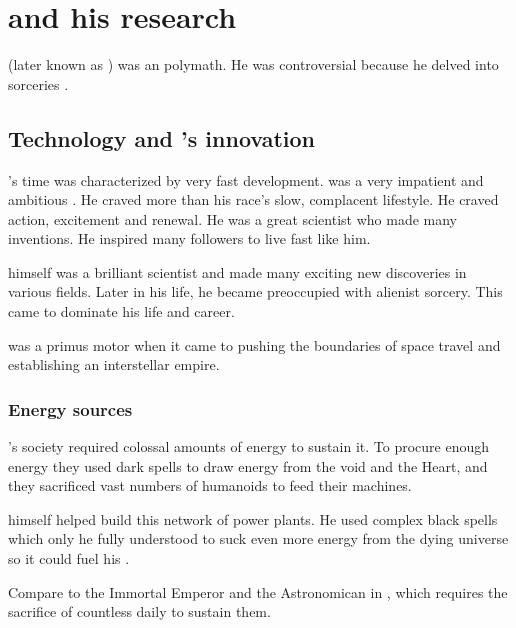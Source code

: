 \section{\Sethicus and his research}
 (later known as \Sethicus) was an \ophidian polymath.
He was controversial because he delved into sorceries . 







\subsection{Technology and \Sethicus's innovation}
\Sethicus's time was characterized by very fast development. 
\Sethicus was a very impatient and ambitious \ophidian.
He craved more than his race's slow, complacent lifestyle.
He craved action, excitement and renewal.
He was a great scientist who made many inventions.
He inspired many followers to live fast like him. 

\Sethicus himself was a brilliant scientist and made many exciting new discoveries in various fields. 
Later in his life, he became preoccupied with alienist sorcery.
This came to dominate his life and career. 

\Sethicus was a primus motor when it came to pushing the boundaries of space travel and establishing an interstellar \ophidian empire. 





\subsubsection{Energy sources}
\Sethicus's society required colossal amounts of energy to sustain it.
To procure enough energy they used dark spells to draw energy from the void and the Heart, and they sacrificed vast numbers of humanoids to feed their machines. 

\Sethicus himself helped build this network of power plants.
He used complex black spells which only he fully understood to suck even more energy from the dying universe so it could fuel his . 

Compare to the Immortal Emperor and the Astronomican in \cite{RPG:Warhammer40000}, which requires the sacrifice of countless \humans daily to sustain them.









